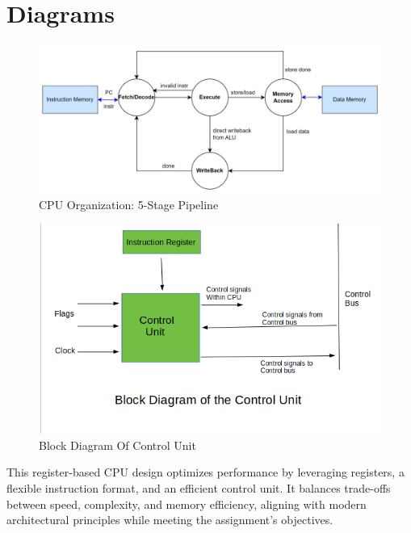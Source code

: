 \documentclass[a4paper,12pt]{article}
\begin{document}
\section{Diagrams}
    \begin{figure}[H] %
        \centering
        \includegraphics[width=1.0\textwidth]{./cpu1.jpg}
        \caption{CPU Organization: 5-Stage Pipeline}
    \end{figure}
    \begin{figure}[H] %
        \centering
        \includegraphics[width=1.0\textwidth]{./control_unit.png}
        \caption{Block Diagram Of Control Unit}
    \end{figure}

This register-based CPU design optimizes performance by leveraging registers, a flexible instruction format, and an efficient control unit. It balances trade-offs between speed, complexity, and memory efficiency, aligning with modern architectural principles while meeting the assignment’s objectives.
\end{document}

